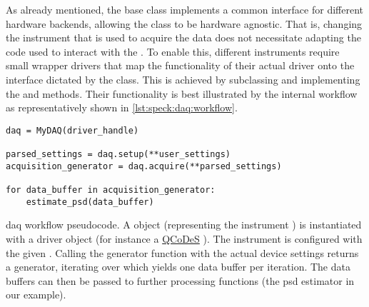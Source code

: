 As already mentioned, the  base class implements a common interface for different hardware backends, allowing the  class to be hardware agnostic.
That is, changing the instrument that is used to acquire the data does not necessitate adapting the code used to interact with the .
To enable this, different instruments require small wrapper drivers that map the functionality of their actual driver onto the interface dictated by the  class.
This is achieved by subclassing  and implementing the  and  methods.
Their functionality is best illustrated by the internal workflow as representatively shown in \cref{lst:speck:daq:workflow}.

\begin{listing}[htpb]
    \begin{verbatim}
daq = MyDAQ(driver_handle)

parsed_settings = daq.setup(**user_settings)
acquisition_generator = daq.acquire(**parsed_settings)

for data_buffer in acquisition_generator:
    estimate_psd(data_buffer)
    \end{verbatim}
    \caption[\gls{daq} workflow pseudocode]{
        \gls{daq} workflow pseudocode.
        A  object (representing the instrument ) is instantiated with a driver object (for instance a \href{https://github.com/microsoft/qcodes}{QCoDeS} ).
        The instrument is configured with the given .
        Calling the generator function  with the actual device settings returns a generator, iterating over which yields one data buffer per iteration.
        The data buffers can then be passed to further processing functions (the \gls{psd} estimator in our example).
    }
    \label{lst:speck:daq:workflow}
\end{listing}

